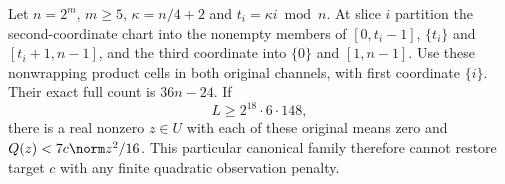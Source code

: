 \begin{proposition}\label{prop:chartrefinement}
Let $n=2^m$, $m\geq5$, $\kappa=n/4+2$ and $t_i=\kappa i\bmod n$.
At slice $i$ partition the second-coordinate chart into the nonempty members
of $[0,t_i-1]$, $\{t_i\}$ and $[t_i+1,n-1]$, and the third coordinate
into $\{0\}$ and $[1,n-1]$. Use these nonwrapping product cells in both
original channels, with first coordinate $\{i\}$. Their exact full count is
$36n-24$. If
\begin{equation}\label{eq:chartthreshold}
 L\geq2^{18}\cdot6\cdot148,
\end{equation}
there is a real nonzero $z\in U$ with each of these original means zero and
$Q(z)<7c\norm z^2/16$. This particular canonical family therefore cannot
restore target $c$ with any finite quadratic observation penalty.
\end{proposition}

